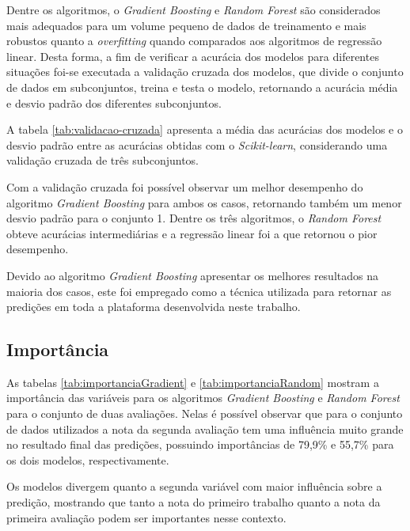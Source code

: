 



Dentre os algoritmos, o \textit{Gradient Boosting} e \textit{Random Forest} são considerados mais adequados para um volume pequeno de dados de treinamento e mais robustos quanto a \textit{overfitting} quando comparados aos algoritmos de regressão linear.
Desta forma, a fim de verificar a acurácia dos modelos para diferentes situações foi-se executada a validação cruzada dos modelos, que divide o conjunto de dados em subconjuntos, treina e testa o modelo, retornando a acurácia média e desvio padrão dos diferentes subconjuntos.

A tabela \ref{tab:validacao-cruzada} apresenta a média das acurácias dos modelos e o desvio padrão entre as acurácias obtidas com o \textit{Scikit-learn}, considerando uma validação cruzada de três subconjuntos.



Com a validação cruzada foi possível observar um melhor desempenho do algoritmo \textit{Gradient Boosting} para ambos os casos, retornando também um menor desvio padrão para o conjunto 1.
Dentre os três algoritmos, o \textit{Random Forest} obteve acurácias intermediárias e a regressão linear foi a que retornou o pior desempenho.

Devido ao algoritmo \textit{Gradient Boosting} apresentar os melhores resultados na maioria dos casos, este foi empregado como a técnica utilizada para retornar as predições em toda a plataforma desenvolvida neste trabalho.

\subsection{Importância}

As tabelas \ref{tab:importanciaGradient} e \ref{tab:importanciaRandom} mostram a importância das variáveis para os algoritmos \textit{Gradient Boosting} e \textit{Random Forest} para o conjunto de duas avaliações.
Nelas é possível observar que para o conjunto de dados utilizados a nota da segunda avaliação tem uma influência muito grande no resultado final das predições, possuindo importâncias de 79,9\% e 55,7\% para os dois modelos, respectivamente.

Os modelos divergem quanto a segunda variável com maior influência sobre a predição, mostrando que tanto a nota do primeiro trabalho quanto a nota da primeira avaliação podem ser importantes nesse contexto.

